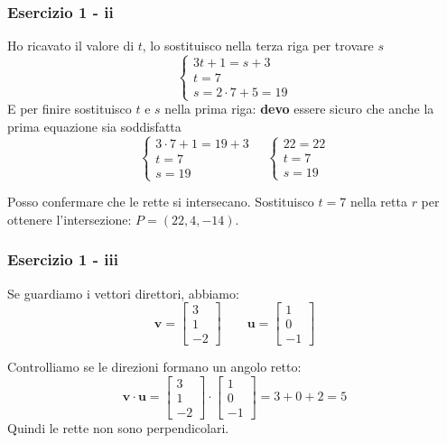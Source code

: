 \documentclass{beamer}
\begin{document}
\begin{frame}
    \frametitle{Esercizio 1 - ii}
    Ho ricavato il valore di $t$, lo sostituisco nella terza riga per trovare $s$
$$
    \left\{\begin{array}{l}
          3t+1=s+3\\
          t=7\\
          s=2\cdot7+5 = 19
         \end{array}\right . 
$$
    E per finire sostituisco $t$ e $s$ nella prima riga: \textbf{devo} essere sicuro che anche la prima equazione sia soddisfatta
$$
    \left\{\begin{array}{l}
          3\cdot7 + 1 = 19 + 3 \\
          t=7\\
          s=19
         \end{array}\right . 
    \quad
    \left\{\begin{array}{l}
          22=22\\
          t= 7\\
          s= 19
         \end{array}\right . 
$$

Posso confermare che le rette si intersecano.
Sostituisco $t=7$ nella retta $r$ per ottenere l'intersezione: $P=(22,4,-14)$.

\end{frame}

\begin{frame}
\frametitle{Esercizio 1 - iii}

Se guardiamo i vettori direttori, abbiamo:
$$
\mathbf{v} = \left[
\begin{array}{c}
3\\
1\\
-2
\end{array}
\right]
\qquad
    \mathbf{u} = \left[
\begin{array}{c}
1\\
0\\
-1
\end{array}
\right]
$$

Controlliamo se le direzioni formano un angolo retto:
$$
    \mathbf{v} \cdot \mathbf{u}
    =
    \left[
\begin{array}{c}
3\\
1\\
-2
\end{array}
\right]
\cdot
\left[
\begin{array}{c}
1\\
0\\
-1
\end{array}
\right]
= 3 + 0 + 2 = 5
$$
Quindi le rette non sono perpendicolari.
\end{frame}
\end{document}
